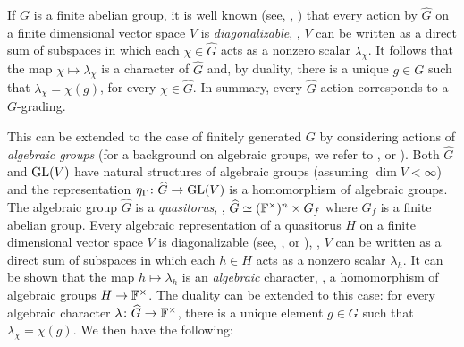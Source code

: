     
    
    


% 

If $G$ is a finite abelian group, it is well known (see, \eg, \cite[\S 1.2]{FultonAndHarris}) that every action by $\widehat G$ on a finite dimensional vector space $V$ is \emph{diagonalizable}, \ie, $V$ can be written as a direct sum of subspaces in which each $\chi \in \widehat G$ acts as a nonzero scalar $\lambda_\chi$. 
It follows that the map $\chi \mapsto \lambda_\chi$ is a character of $\widehat G$ and, by duality, there is a unique $g \in G$ such that $\lambda_\chi = \chi(g)$, for every $\chi \in \widehat G$. 
In summary, every $\widehat G$-action corresponds to a $G$-grading.

This can be extended to the case of finitely generated $G$ by considering actions of \emph{algebraic groups} (for a background on algebraic groups, we refer to \cite{MR1064110}, \cite{Arzhantsev-notes} or \cite[Appendix A]{livromicha}). 
Both $\widehat G$ and $\operatorname{GL} (V)$ have natural structures of algebraic groups  (assuming $\dim V < \infty$) and the representation $\eta_\Gamma \colon \widehat G \to \operatorname{GL} (V)$ is a homomorphism of algebraic groups. 
The algebraic group $\widehat G$ is a \emph{quasitorus}, \ie, $\widehat G \simeq (\mathbb{F}^\times)^n \times G_f$ where $G_f$ is a finite abelian group. 
Every algebraic representation of a quasitorus $H$ on a finite dimensional vector space $V$ is diagonalizable (see, \eg, \cite[Chapter 3, \S 2, Theorem 3]{MR1064110} or \cite[Theorem 1.6.13]{Arzhantsev-notes}), \ie, $V$ can be written as a direct sum of subspaces in which each $h \in H$ acts as a nonzero scalar $\lambda_h$. 
It can be shown that the map $h \mapsto \lambda_h$ is an \emph{algebraic} character, \ie, a homomorphism of algebraic groups $H \to \mathbb{F}^\times$. 
The duality can be extended to this case: for every algebraic character $\lambda\colon \widehat G \to \mathbb{F}^\times$, there is a unique element $g\in G$ such that $\lambda_\chi = \chi(g)$. 
We then have the following:

